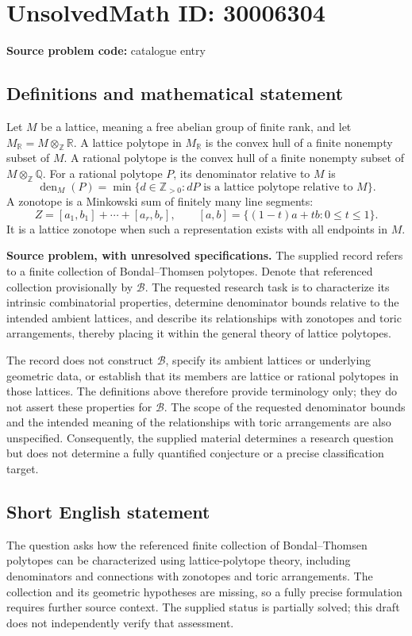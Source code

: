 \documentclass[11pt]{article}
\newcommand{\Z}{\mathbb{Z}}
\newcommand{\Q}{\mathbb{Q}}
\newcommand{\R}{\mathbb{R}}
\begin{document}
\section*{UnsolvedMath ID: 30006304}
\textbf{Source problem code:} catalogue entry
\subsection{Definitions and mathematical statement}
Let \(M\) be a lattice, meaning a free abelian group of finite rank, and let \(M_{\R}=M\otimes_{\Z}\R\). A lattice polytope in \(M_{\R}\) is the convex hull of a finite nonempty subset of \(M\). A rational polytope is the convex hull of a finite nonempty subset of \(M\otimes_{\Z}\Q\). For a rational polytope \(P\), its denominator relative to \(M\) is
\[
\operatorname{den}_{M}(P)=\min\{d\in\Z_{>0}:dP\text{ is a lattice polytope relative to }M\}.
\]
A zonotope is a Minkowski sum of finitely many line segments:
\[
Z=[a_1,b_1]+\cdots+[a_r,b_r],\qquad [a,b]=\{(1-t)a+tb:0\leq t\leq1\}.
\]
It is a lattice zonotope when such a representation exists with all endpoints in \(M\).

\textbf{Source problem, with unresolved specifications.} The supplied record refers to a finite collection of Bondal--Thomsen polytopes. Denote that referenced collection provisionally by \(\mathcal B\). The requested research task is to characterize its intrinsic combinatorial properties, determine denominator bounds relative to the intended ambient lattices, and describe its relationships with zonotopes and toric arrangements, thereby placing it within the general theory of lattice polytopes.

The record does not construct \(\mathcal B\), specify its ambient lattices or underlying geometric data, or establish that its members are lattice or rational polytopes in those lattices. The definitions above therefore provide terminology only; they do not assert these properties for \(\mathcal B\). The scope of the requested denominator bounds and the intended meaning of the relationships with toric arrangements are also unspecified. Consequently, the supplied material determines a research question but does not determine a fully quantified conjecture or a precise classification target.
\subsection{Short English statement}
The question asks how the referenced finite collection of Bondal--Thomsen polytopes can be characterized using lattice-polytope theory, including denominators and connections with zonotopes and toric arrangements. The collection and its geometric hypotheses are missing, so a fully precise formulation requires further source context. The supplied status is partially solved; this draft does not independently verify that assessment.
\end{document}
